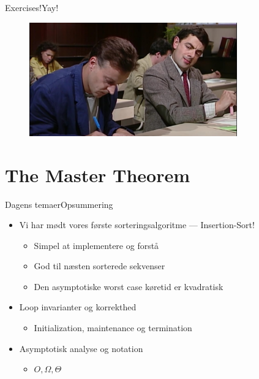 \documentclass[aspectratio=1610]{beamer}
\begin{document}
\begin{frame}{Exercises!}{Yay!}
    
    \begin{figure}[h]
        \centering
        \includegraphics[width=0.8\textwidth]{exercises}
    \end{figure}
    
\end{frame}


\section{The Master Theorem}

\begin{frame}{Dagens temaer}{Opsummering}
    \begin{itemize}
        \item Vi har mødt vores første sorteringsalgoritme --- Insertion-Sort!
            \begin{itemize}
                \item Simpel at implementere og forstå
                \item God til næsten sorterede sekvenser
                \item Den asymptotiske worst case køretid er kvadratisk
            \end{itemize}
        \item Loop invarianter og korrekthed
            \begin{itemize}
                \item Initialization, maintenance og termination
            \end{itemize}
        \item Asymptotisk analyse og notation
            \begin{itemize}
                \item $O, \Omega, \Theta$
            \end{itemize}
    \end{itemize}
\end{frame}
\end{document}
